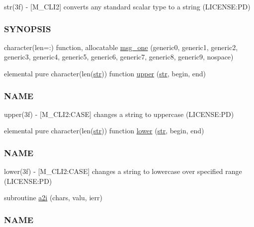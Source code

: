 \begin{DoxyCompactItemize}
\begin{DoxyCompactList}
str(3f) -\/ \mbox{[}M\+\_\+\+C\+L\+I2\mbox{]} converts any standard scalar type to a string (L\+I\+C\+E\+N\+SE\+:PD) \subsubsection*{S\+Y\+N\+O\+P\+S\+IS}\end{DoxyCompactList}\item 
character(len=\+:) function, allocatable \mbox{\hyperlink{namespacem__cli2_a368e9aaa556f69228e7f0837bd558b82}{msg\+\_\+one}} (generic0, generic1, generic2, generic3, generic4, generic5, generic6, generic7, generic8, generic9, nospace)
\item 
elemental pure character(len(\mbox{\hyperlink{interfacem__cli2_1_1str}{str}})) function \mbox{\hyperlink{namespacem__cli2_afa7a2419002024ff6d950c5d905ddd7a}{upper}} (\mbox{\hyperlink{interfacem__cli2_1_1str}{str}}, begin, end)
\begin{DoxyCompactList}\small\item\em \subsubsection*{N\+A\+ME}

upper(3f) -\/ \mbox{[}M\+\_\+\+C\+L\+I2\+:C\+A\+SE\mbox{]} changes a string to uppercase (L\+I\+C\+E\+N\+SE\+:PD) \end{DoxyCompactList}\item 
elemental pure character(len(\mbox{\hyperlink{interfacem__cli2_1_1str}{str}})) function \mbox{\hyperlink{namespacem__cli2_a6d2d93ab8471667e632bf7a0e95ebd13}{lower}} (\mbox{\hyperlink{interfacem__cli2_1_1str}{str}}, begin, end)
\begin{DoxyCompactList}\small\item\em \subsubsection*{N\+A\+ME}

lower(3f) -\/ \mbox{[}M\+\_\+\+C\+L\+I2\+:C\+A\+SE\mbox{]} changes a string to lowercase over specified range (L\+I\+C\+E\+N\+SE\+:PD) \end{DoxyCompactList}\item 
subroutine \mbox{\hyperlink{namespacem__cli2_a0be58233adafc0bf10dfe69300a05b9f}{a2i}} (chars, valu, ierr)
\begin{DoxyCompactList}\small\item\em \subsubsection*{N\+A\+ME}


\end{DoxyCompactList}
\end{DoxyCompactItemize}
